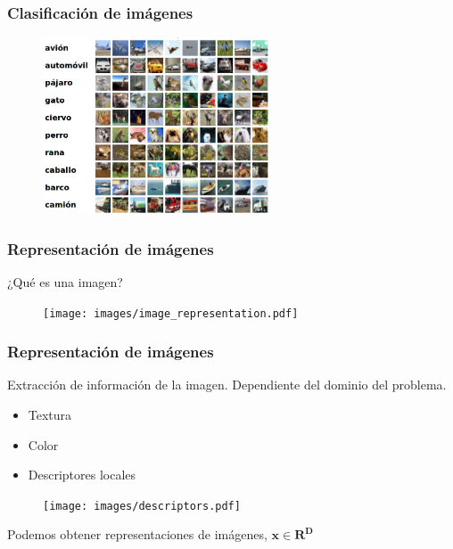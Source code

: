 \documentclass{beamer}
\begin{document}
\begin{frame}[plain] 
\frametitle{Clasificación de imágenes}
\begin{figure}
    \centering
    \includegraphics[width=0.6\textwidth]{images/ciphar10.png}
\end{figure}
\end{frame}




\begin{frame}[plain]
\frametitle{Representación de imágenes}
¿Qué es una imagen?
\begin{figure}
    \centering
    \texttt{[image: images/image\_representation.pdf]}
\end{figure}
\end{frame}




\begin{frame}[plain]
\frametitle{Representación de imágenes}
Extracción de información de la imagen.
\vfill
Dependiente del dominio del problema.
\vfill
\begin{itemize}
    \item Textura
    \item Color
    \item Descriptores locales
\end{itemize}
\vfill
\begin{figure}
    \centering
    \texttt{[image: images/descriptors.pdf]}
\end{figure}
\vfill
Podemos obtener representaciones de imágenes, \(\boldsymbol{x} \in \boldsymbol{R^{D}}\)
\end{frame}
\end{document}

